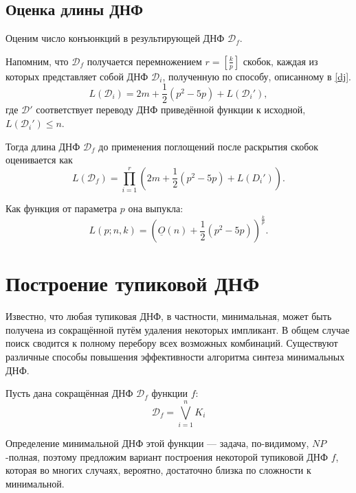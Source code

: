 \documentclass[12pt,a4paper,oneside,fleqn,leqno]{article}
\theoremstyle{definition}
\begin{document}
		\subsection{Оценка длины ДНФ}
			Оценим число конъюнкций в результирующей ДНФ $\mathcal{D}_f.$\par
			Напомним, что $\mathcal{D}_f$ получается перемножением $r = \left [ \frac{k}{p}\right ]$ скобок, каждая из которых представляет собой ДНФ $\mathcal{D}_i$, полученную по способу, описанному в \ref{dj}. 
			$$L(\mathcal{D}_i) = 2m + \frac{1}{2}(p^2 - 5p) + L(\mathcal{D}_i'),$$
			где $\mathcal{D}'$ соответствует переводу ДНФ приведённой функции к исходной, $L(\mathcal{D}_i') \leqslant n$.\par
			Тогда длина ДНФ $\mathcal{D}_f$ до применения поглощений после раскрытия скобок оценивается как
			$$
				L(\mathcal{D}_f) = \prod_{i = 1}^{r} \left(2m + \frac{1}{2}(p^2 - 5p) + L(D_i') \right).
			$$\par
			Как функция от параметра $p$ она выпукла:
			$$
				L(p; n, k) = \left( \underline{O}(n) + \frac{1}{2}(p^2 - 5p)\right)^{\frac{k}{p}}.
			$$
	\section{Построение тупиковой ДНФ}
		Известно, что любая тупиковая ДНФ, в частности, минимальная, может быть получена из сокращённой путём удаления некоторых импликант. В общем случае поиск сводится к полному перебору всех возможных комбинаций. Существуют различные способы повышения эффективности алгоритма синтеза минимальных ДНФ.\par
		Пусть дана сокращённая ДНФ $\mathcal{D}_{f}$ функции $f$:
		$$
			\mathcal{D}_{f} = \bigvee_{i = 1}^{n} K_{i}
		$$ \par
		Определение минимальной ДНФ этой функции --- задача, по-видимому, $NP$-полная, поэтому предложим вариант построения некоторой тупиковой ДНФ $f$, которая во многих случаях, вероятно, достаточно близка по сложности к минимальной.
\end{document}
